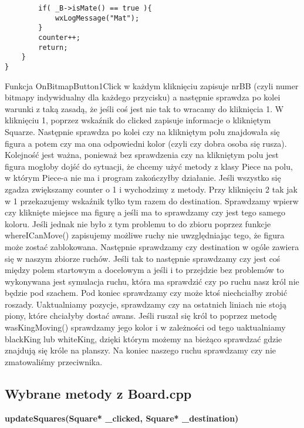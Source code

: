 \documentclass[]{report}
\begin{document}
\begin{flushleft}
\begin{lstlisting}
		if( _B->isMate() == true ){
			wxLogMessage("Mat");
		}
		counter++;
		return;
	}
}
\end{lstlisting}
\vspace{\baselineskip}
Funkcja OnBitmapButton1Click w każdym kliknięciu zapisuje nrBB (czyli numer bitmapy indywidualny dla każdego przycisku) a następnie sprawdza po kolei warunki z taką zasadą, że jeśli coś jest nie tak to wracamy do kliknięcia 1. W kliknięciu 1, poprzez wskaźnik do clicked zapisuje informacje o klikniętym Squarze. Następnie sprawdza po kolei czy na klikniętym polu znajdowała się figura a potem czy ma ona odpowiedni kolor (czyli czy dobra osoba się rusza). Kolejność jest ważna, ponieważ bez sprawdzenia czy na klikniętym polu jest figura mogłoby dojść do sytuacji, że chcemy użyć metody z klasy Piece na polu, w którym Piece-a nie ma i program zakończyłby działanie. Jeśli wszystko się zgadza zwiększamy counter o 1 i wychodzimy z metody. Przy kliknięciu 2 tak jak w 1 przekazujemy wskaźnik tylko tym razem do destination. Sprawdzamy wpierw czy kliknięte miejsce ma figurę a jeśli ma to sprawdzamy czy jest tego samego koloru. Jeśli jednak nie było z tym problemu to do zbioru poprzez funkcje whereICanMove() zapisujemy możliwe ruchy nie uwzględniając tego, że figura może zostać zablokowana. Następnie sprawdzamy czy destination w ogóle zawiera się w naszym zbiorze ruchów. Jeśli tak to następnie sprawdzamy czy jest coś między polem startowym a docelowym a jeśli i to przejdzie bez problemów to wykonywana jest symulacja ruchu, która ma sprawdzić czy po ruchu nasz król nie będzie pod szachem. Pod koniec sprawdzamy czy może ktoś niechciałby zrobić roszady. Uaktualniamy pozycje, sprawdzamy czy na ostatnich liniach nie stoją piony, które chciałyby dostać awans. Jeśli ruszał się król to poprzez metodę wasKingMoving() sprawdzamy jego kolor i w zależności od tego uaktualniamy blackKing lub whiteKing, dzięki którym możemy na bieżąco sprawdzać gdzie znajdują się króle na planszy. Na koniec naszego ruchu sprawdzamy czy nie zmatowaliśmy przeciwnika.
\newpage
\subsection*{Wybrane metody z Board.cpp}
\textbf{updateSquares(Square* \_clicked, Square* \_destination)}


\end{flushleft}
\end{document}
